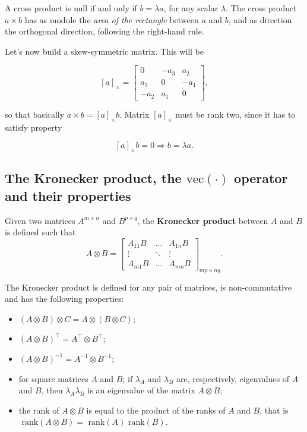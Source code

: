 \documentclass[10pt]{report}
\begin{document}
A cross product is null if and only if \(b = \lambda a\), for any scalar \(\lambda\). The cross product \(a \times b\) has as module the \emph{area of the rectangle} between \(a\) and \(b\), and as direction the orthogonal direction, following the right\--hand rule.

Let's now build a skew-symmetric matrix. This will be

\[[a]_ \times = \begin{bmatrix} 0 & -a_3 & a_2 \\ a_3 & 0 & -a_1 \\ -a_2 & a_1 & 0 \end{bmatrix}, \]

so that basically \(a \times b = [a]_ \times b\). Matrix \([a]_ \times\)
must be rank two, since it has to satisfy property

\[[a]_ \times b = 0 \Rightarrow b = \lambda a.\]

\subsection{The Kronecker product, the \(\mbox{vec}(\cdot)\) operator and their properties}
\label{sec:org272c6a0}
Given two matrices \(A^{m \times n}\) and \(B^{p \times q}\), the \textbf{Kronecker product} between \(A\) and \(B\) is defined such that $$A \otimes B = \begin{bmatrix} A_{11}B & \dots & A_{1n}B \\ \vdots & \ddots & \vdots \\ A_{m1}B & \dots & A_{mn}B\end{bmatrix}_{mp \times nq}.$$

The Kronecker product is defined for any pair of matrices, is non\--commutative and has the following properties:
\begin{itemize}
\item \((A \otimes B) \otimes C = A \otimes (B \otimes C)\);
\item \((A \otimes B)^\top = A^\top \otimes B^\top\);
\item \((A \otimes B)^{-1} = A^{-1} \otimes B^{-1}\);
\item for square matrices \(A\) and \(B\); if \(\lambda_A\) and \(\lambda_B\) are, respectively, eigenvalues of \(A\) and \(B\), then \(\lambda_A \lambda_B\) is an eigenvalue of the matrix \(A \otimes B\);
\item the rank of \(A \otimes B\) is equal to the product of the ranks of \(A\) and \(B\), that is \(\mbox{ rank} (A \otimes B) = \mbox{ rank}(A)\mbox{ rank}(B)\).
\end{itemize}
\end{document}
